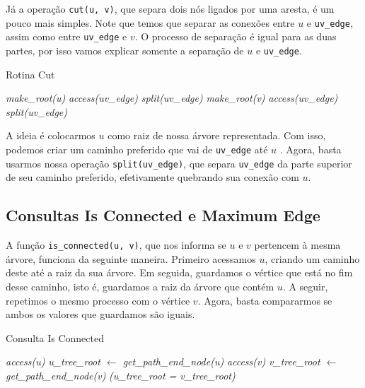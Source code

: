Já a operação \texttt{cut(u, v)}, que separa dois nós ligados por uma aresta, é um pouco mais simples. Note que temos que separar as conexões entre $u$ e \texttt{uv\_edge}, assim como entre \texttt{uv\_edge} e $v$. O processo de separação é igual para as duas partes, por isso vamos explicar somente a separação de $u$ e \texttt{uv\_edge}.

\begin{algorithm}[h!]
    \caption{Rotina Cut}\label{lct:cut}
    \begin{algorithmic}[1]
        \State {}
        \State \emph{make\_root(u)}
        \State \emph{access(uv\_edge)}
        \State \emph{split(uv\_edge)}
        \State {}
        \State \emph{make\_root(v)}
        \State \emph{access(uv\_edge)}
        \State \emph{split(uv\_edge)}
        \EndFunction
    \end{algorithmic}
\end{algorithm}

A ideia é colocarmos $u$ como raiz de nossa árvore representada. Com isso, podemos criar um caminho preferido que vai de \texttt{uv\_edge} até $u$ . Agora, basta usarmos nossa operação \texttt{split(uv\_edge)}, que separa \texttt{uv\_edge} da parte superior de seu caminho preferido, efetivamente quebrando sua conexão com $u$.

\subsection{Consultas Is Connected e Maximum Edge}
\label{subsection:lct-is-connected}

A função \texttt{is\_connected(u, v)}, que nos informa se $u$ e $v$ pertencem à mesma árvore, funciona da seguinte maneira. Primeiro acessamos $u$, criando um caminho deste até a raiz da sua árvore. Em seguida, guardamos o vértice que está no fim desse caminho, isto é, guardamos a raiz da árvore que contém $u$. A seguir, repetimos o mesmo processo com o vértice $v$. Agora, basta compararmos se ambos os valores que guardamos são iguais.

\begin{algorithm}[h!]
    \caption{Consulta Is Connected}\label{lct:is-connected}
    \begin{algorithmic}[1]
        \State \emph{access(u)}
        \State \emph{u\_tree\_root $\gets$ get\_path\_end\_node(u)}
        \State \emph{access(v)}
        \State \emph{v\_tree\_root $\gets$ get\_path\_end\_node(v)}
        \State \Return \emph{(u\_tree\_root = v\_tree\_root)}
        \EndFunction
    \end{algorithmic}
\end{algorithm}

